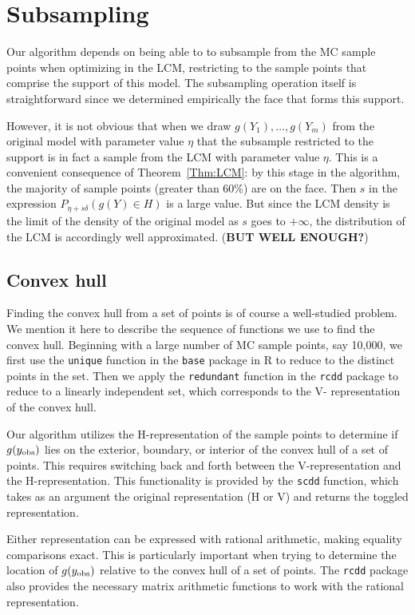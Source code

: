 \section{Subsampling}
Our algorithm depends on being able to to subsample from the MC sample points when 
optimizing in the LCM, restricting to the sample points that comprise the support of 
this model.  The subsampling operation itself is straightforward since we determined 
empirically the face that forms this support.  

However, it is not obvious that when we draw $g(Y_1), \ldots, g(Y_m)$ from the 
original model with parameter value $\eta$ that the subsample restricted to the 
support is in fact a sample from the LCM with parameter value $\eta$.  This is a 
convenient consequence of Theorem~\ref{Thm:LCM}: by this stage in the algorithm, the 
majority of sample points (greater than 60\%) are on the face.  Then $s$ in the 
expression $P_{\eta + s \delta}(g(Y) \in H)$ is a large value.  But since the LCM 
density is the limit of the density of the original model as $s$ goes to $+\infty$, 
the distribution of the LCM is accordingly well approximated.  (\textbf{BUT WELL 
ENOUGH?})


\subsection{Convex hull}
Finding the convex hull from a set of points is of course a well-studied problem.  We 
mention it here to describe the sequence of functions we use to find the convex hull.  
Beginning with a large number of MC sample points, say 10,000, we first use the 
\texttt{unique} function in the \texttt{base} package in R to reduce to the distinct 
points in the set.  Then we apply the \texttt{redundant} function in the \texttt{rcdd} 
package to reduce to a linearly independent set, which corresponds to the V-
representation of the convex hull.

Our algorithm utilizes the H-representation of the sample points to determine if $g(y_{\textrm{obs}})$ lies on the 
exterior, boundary, or interior of the convex hull of a set of points.  
This requires switching back and forth between the V-representation and 
the H-representation.  
This functionality is provided by the \texttt{scdd} function, which takes as an 
argument the original representation (H or V) and returns the toggled representation.

Either representation can be expressed with rational arithmetic, making equality 
comparisons exact.  This is particularly important when trying to determine the 
location of $g(y_{\textrm{obs}})$ relative to the convex hull of a set of points.  The \texttt
{rcdd} package also provides the necessary matrix arithmetic functions to work with 
the rational representation.
